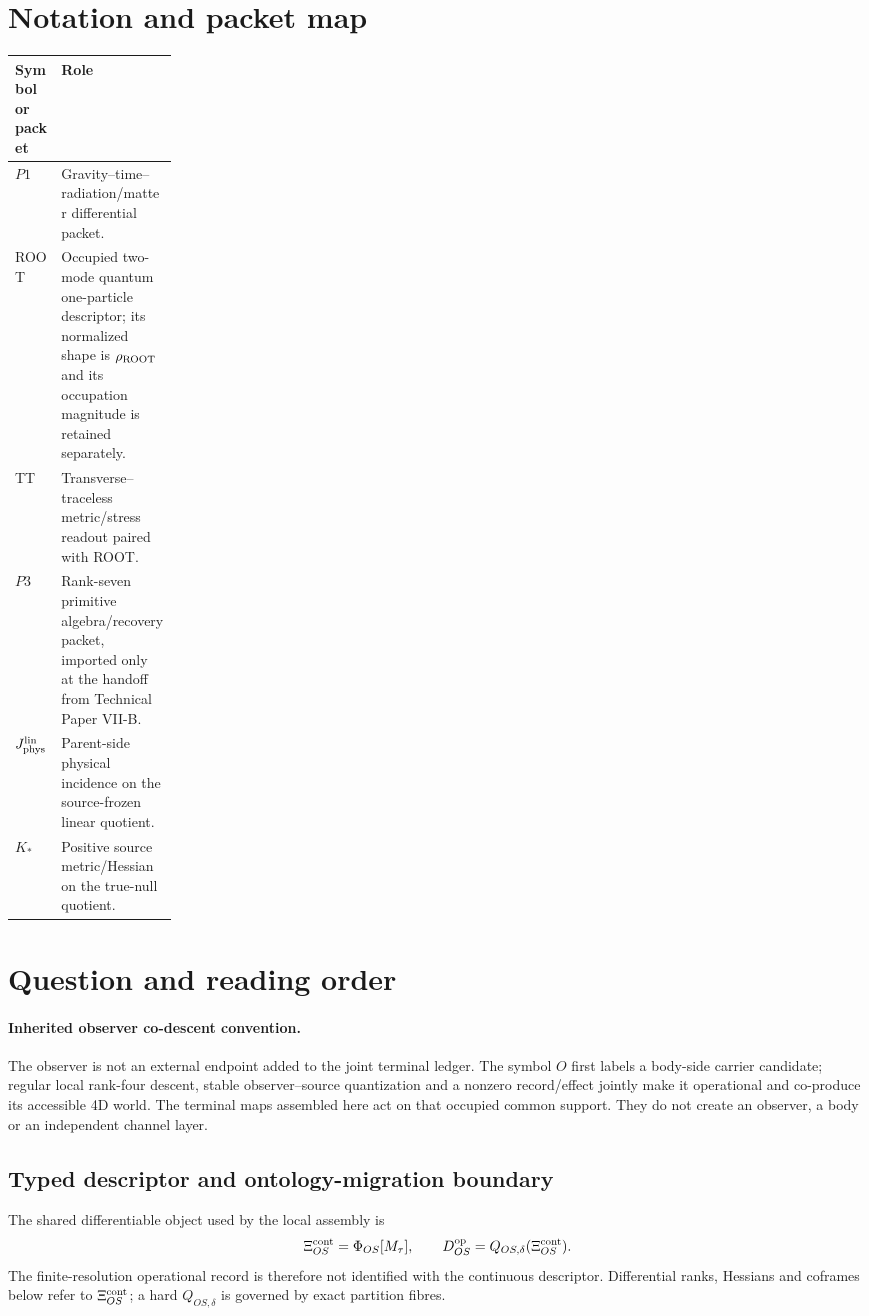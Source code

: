 \documentclass[11pt]{article}
\begin{document}
\section*{Notation and packet map}
\begin{center}\small
\begin{tabularx}{0.94\linewidth}{@{}p{0.19\linewidth}X@{}}
\toprule
Symbol or packet & Role\\
\midrule
$P1$ & Gravity--time--radiation/matter differential packet.\\
ROOT & Occupied two-mode quantum one-particle descriptor; its normalized shape
is $\rho_{\rm ROOT}$ and its occupation magnitude is retained separately.\\
TT & Transverse--traceless metric/stress readout paired with ROOT.\\
$P3$ & Rank-seven primitive algebra/recovery packet, imported only at the
handoff from Technical Paper VII-B.\\
$J_{\rm phys}^{\rm lin}$ & Parent-side physical incidence on the source-frozen
linear quotient.\\
$K_*$ & Positive source metric/Hessian on the true-null quotient.\\
\bottomrule
\end{tabularx}
\end{center}

\section{Question and reading order}

\paragraph{Inherited observer co-descent convention.}
The observer is not an external endpoint added to the joint terminal ledger.
The symbol $O$ first labels a body-side carrier candidate; regular local
rank-four descent, stable observer--source quantization and a nonzero
record/effect jointly make it operational and co-produce its accessible 4D
world.  The terminal maps assembled here act on that occupied common support.
They do not create an observer, a body or an independent channel layer.

\subsection*{Typed descriptor and ontology-migration boundary}
The shared differentiable object used by the local assembly is
\begin{equation}
 \Xi_{OS}^{\rm cont}=\Phi_{OS}[M_\tau],
 \qquad
 D_{OS}^{\rm op}=Q_{OS,\delta}(\Xi_{OS}^{\rm cont}).
 \label{eq:viia-cont-operational}
\end{equation}
The finite-resolution operational record is therefore not identified with
the continuous descriptor.  Differential ranks, Hessians and coframes below
refer to $\Xi_{OS}^{\rm cont}$; a hard $Q_{OS,\delta}$ is governed by exact
partition fibres.
\end{document}
